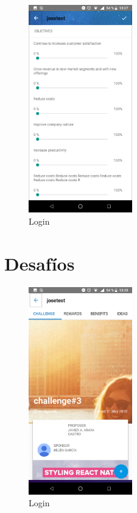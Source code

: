 \begin{figure}[!h]
	\begin{center}
		\includegraphics[width=0.4\textwidth]{./img/anexo1/crear_idea_cont.png}
		\caption{Login}
		\label{fig:crear_idea_cont}
	\end{center}
\end{figure}

\section{Desafíos}

\begin{figure}[!h]
	\begin{center}
		\includegraphics[width=0.4\textwidth]{./img/anexo1/ver_desafio_inicio.png}
		\caption{Login}
		\label{fig:ver_desafio_inicio}
	\end{center}
\end{figure}

